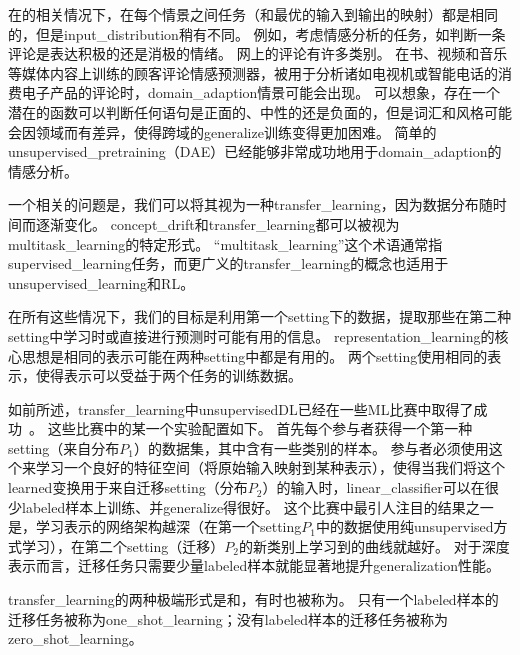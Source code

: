 
在的相关情况下，在每个情景之间任务（和最优的输入到输出的映射）都是相同的，但是\gls{input_distribution}稍有不同。 
例如，考虑情感分析的任务，如判断一条评论是表达积极的还是消极的情绪。 
网上的评论有许多类别。
在书、视频和音乐等媒体内容上训练的顾客评论情感预测器，被用于分析诸如电视机或智能电话的消费电子产品的评论时，\gls{domain_adaption}情景可能会出现。%
可以想象，存在一个潜在的函数可以判断任何语句是正面的、中性的还是负面的，但是词汇和风格可能会因领域而有差异，使得跨域的\gls{generalize}训练变得更加困难。
简单的\gls{unsupervised_pretraining}（\gls{DAE}）已经能够非常成功地用于\gls{domain_adaption}的情感分析\citep{Glorot+al-ICML-2011}。


一个相关的问题是，我们可以将其视为一种\gls{transfer_learning}，因为数据分布随时间而逐渐变化。
\gls{concept_drift}和\gls{transfer_learning}都可以被视为\gls{multitask_learning}的特定形式。
``\gls{multitask_learning}''这个术语通常指\gls{supervised_learning}任务，而更广义的\gls{transfer_learning}的概念也适用于\gls{unsupervised_learning}和\gls{RL}。


在所有这些情况下，我们的目标是利用第一个\gls{setting}下的数据，提取那些在第二种\gls{setting}中学习时或直接进行预测时可能有用的信息。
\gls{representation_learning}的核心思想是相同的表示可能在两种\gls{setting}中都是有用的。
两个\gls{setting}使用相同的表示，使得表示可以受益于两个任务的训练数据。


如前所述，\gls{transfer_learning}中\gls{unsupervised}\gls{DL}已经在一些\gls{ML}比赛中取得了成功~\citep{UTLC+LISA-2011-small,goodfellow+all-NIPS2011}。
这些比赛中的某一个实验配置如下。
首先每个参与者获得一个第一种\gls{setting}（来自分布$P_1$）的数据集，其中含有一些类别的样本。
参与者必须使用这个来学习一个良好的特征空间（将原始输入映射到某种表示），使得当我们将这个\gls{learned}变换用于来自迁移\gls{setting}（分布$P_2$）的输入时，\gls{linear_classifier}可以在很少\gls{labeled}样本上训练、并\gls{generalize}得很好。
这个比赛中最引人注目的结果之一是，学习表示的网络架构越深（在第一个\gls{setting}$P_1$中的数据使用纯\gls{unsupervised}方式学习），在第二个\gls{setting}（迁移）$P_2$的新类别上学习到的曲线就越好。
对于深度表示而言，迁移任务只需要少量\gls{labeled}样本就能显著地提升\gls{generalization}性能。


\gls{transfer_learning}的两种极端形式是和，有时也被称为。
只有一个\gls{labeled}样本的迁移任务被称为\gls{one_shot_learning}；没有\gls{labeled}样本的迁移任务被称为\gls{zero_shot_learning}。

